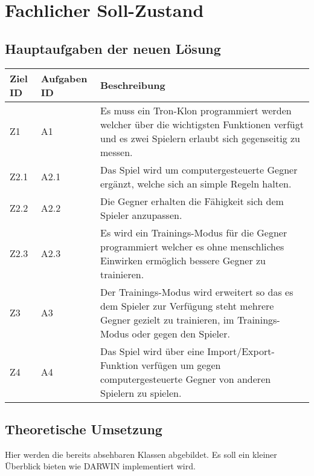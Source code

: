 \usetikzlibrary{arrows,positioning}
\section{Fachlicher Soll-Zustand}


\subsection{Hauptaufgaben der neuen Lösung}

\begin{tabularx}{\textwidth}{| p{0.7cm} | p{1.5cm} | X |}
\hline
\rowcolor[gray]{0.9} Ziel ID & Aufgaben ID & Beschreibung \\
\hline
Z1 & A1 & Es muss ein Tron-Klon programmiert werden welcher über die wichtigsten Funktionen verfügt und es zwei Spielern erlaubt sich gegenseitig zu messen.\\
\hline
Z2.1 & A2.1 & Das Spiel wird um computergesteuerte Gegner ergänzt, welche sich an simple Regeln halten. \\
\hline
Z2.2 & A2.2 & Die Gegner erhalten die Fähigkeit sich dem Spieler anzupassen. \\
\hline 
Z2.3 & A2.3 & Es wird ein Trainings-Modus für die Gegner programmiert welcher es ohne menschliches Einwirken ermöglich bessere Gegner zu trainieren. \\
\hline
Z3 & A3 & Der Trainings-Modus wird erweitert so das es dem Spieler zur Verfügung steht mehrere Gegner gezielt zu trainieren, im Trainings-Modus oder gegen den Spieler. \\
\hline
Z4 & A4 & Das Spiel wird über eine Import/Export-Funktion verfügen um gegen computergesteuerte Gegner von anderen Spielern zu spielen. \\
\hline
\end{tabularx}

\subsection{Theoretische Umsetzung}

Hier werden die bereits absehbaren Klassen abgebildet. Es soll ein kleiner Überblick bieten wie DARWIN implementiert wird. 
\\ \\
	\medskip

